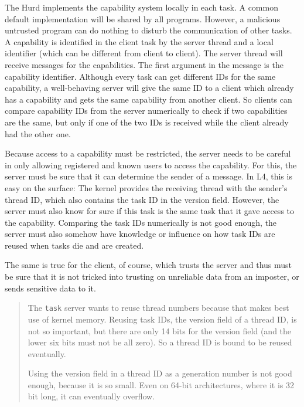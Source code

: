\documentclass[9pt,a4paper]{extarticle}
\newenvironment{comment}{\footnotesize \begin{quote}}{\end{quote}}
\begin{document}
The Hurd implements the capability system locally in each task.  A
common default implementation will be shared by all programs.
However, a malicious untrusted program can do nothing to disturb the
communication of other tasks.  A capability is identified in the
client task by the server thread and a local identifier (which can be
different from client to client).  The server thread will receive
messages for the capabilities.  The first argument in the message is
the capability identifier.  Although every task can get different IDs
for the same capability, a well-behaving server will give the same ID
to a client which already has a capability and gets the same
capability from another client.  So clients can compare capability IDs
from the server numerically to check if two capabilities are the same,
but only if one of the two IDs is received while the client already
had the other one.

Because access to a capability must be restricted, the server needs to
be careful in only allowing registered and known users to access the
capability.  For this, the server must be sure that it can determine
the sender of a message.  In L4, this is easy on the surface: The
kernel provides the receiving thread with the sender's thread ID,
which also contains the task ID in the version field.  However, the
server must also know for sure if this task is the same task that it
gave access to the capability.  Comparing the task IDs numerically is
not good enough, the server must also somehow have knowledge or
influence on how task IDs are reused when tasks die and are created.

The same is true for the client, of course, which trusts the server
and thus must be sure that it is not tricked into trusting on
unreliable data from an imposter, or sends sensitive data to it.

\begin{comment}
  The \texttt{task} server wants to reuse thread numbers because that
  makes best use of kernel memory.  Reusing task IDs, the version
  field of a thread ID, is not so important, but there are only 14
  bits for the version field (and the lower six bits must not be all
  zero).  So a thread ID is bound to be reused eventually.
  
  Using the version field in a thread ID as a generation number is not
  good enough, because it is so small.  Even on 64-bit architectures,
  where it is 32 bit long, it can eventually overflow.
\end{comment}
\end{document}
